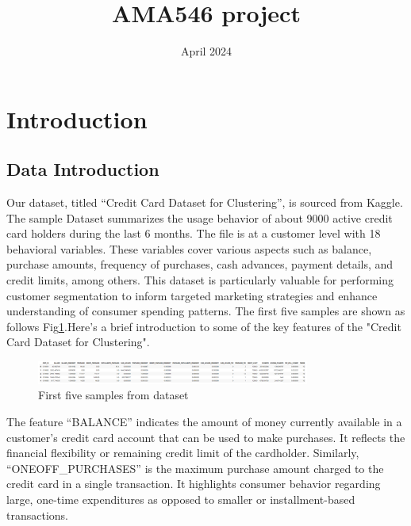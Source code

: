 \documentclass{article}
\title{AMA546 project}
\author{}
\date{April 2024}
\begin{document}
\maketitle
\section{Introduction}
\subsection{Data Introduction}
Our dataset, titled ``Credit Card Dataset for Clustering'', is sourced from Kaggle. The sample Dataset summarizes the usage behavior of about 9000 active credit card holders during the last 6 months. The file is at a customer level with 18 behavioral variables. These variables cover various aspects such as balance, purchase amounts, frequency of purchases, cash advances, payment details, and credit limits, among others. This dataset is particularly valuable for performing customer segmentation to inform targeted marketing strategies and enhance understanding of consumer spending patterns. The first five samples are shown as follows Fig\ref{fig:dataset}.Here's a brief introduction to some of the key features of the "Credit Card Dataset for Clustering".
\begin{figure}[hbt!]
    \centering
    \includegraphics[width=0.8\textwidth]{fig/zya/dataset.png}
    \caption{First five samples from dataset}
    \label{fig:dataset}  %
\end{figure}

The feature ``BALANCE'' indicates the amount of money currently available in a customer's credit card account that can be used to make purchases. It reflects the financial flexibility or remaining credit limit of the cardholder. Similarly, ``ONEOFF\_PURCHASES'' is the maximum purchase amount charged to the credit card in a single transaction. It highlights consumer behavior regarding large, one-time expenditures as opposed to smaller or installment-based transactions.
\end{document}
